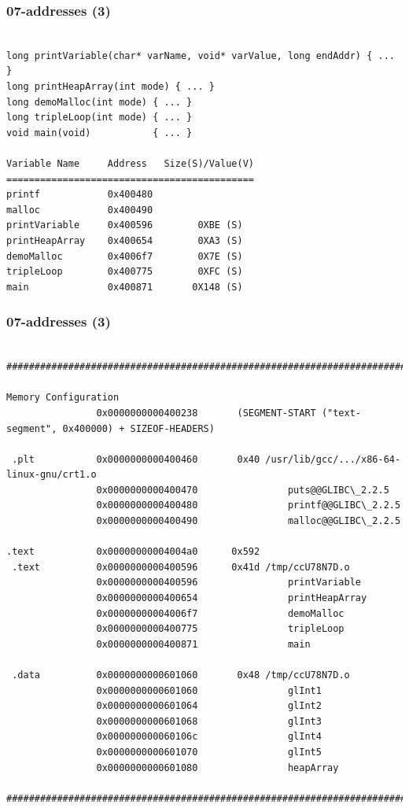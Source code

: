 \documentclass[xcolor=table, notheorems, hyperref={pdfpagelabels=false}]{beamer}
\begin{document}
\begin{frame}[fragile]
\frametitle{07-addresses (3)}
\begin{lstlisting}[basicstyle=\ttfamily\footnotesize]

long printVariable(char* varName, void* varValue, long endAddr) { ... }
long printHeapArray(int mode) { ... }
long demoMalloc(int mode) { ... }
long tripleLoop(int mode) { ... }
void main(void)           { ... }

Variable Name     Address   Size(S)/Value(V)
============================================
printf            0x400480
malloc            0x400490
printVariable     0x400596        0XBE (S)
printHeapArray    0x400654        0XA3 (S)
demoMalloc        0x4006f7        0X7E (S)
tripleLoop        0x400775        0XFC (S)
main              0x400871       0X148 (S)

\end{lstlisting}
\end{frame}

\begin{frame}[fragile]
\frametitle{07-addresses (3)}
\begin{lstlisting}[basicstyle=\ttfamily\tiny]

####################################################################################################

Memory Configuration
                0x0000000000400238       (SEGMENT-START ("text-segment", 0x400000) + SIZEOF-HEADERS)

 .plt           0x0000000000400460       0x40 /usr/lib/gcc/.../x86-64-linux-gnu/crt1.o
                0x0000000000400470                puts@@GLIBC\_2.2.5
                0x0000000000400480                printf@@GLIBC\_2.2.5
                0x0000000000400490                malloc@@GLIBC\_2.2.5

.text           0x00000000004004a0      0x592
 .text          0x0000000000400596      0x41d /tmp/ccU78N7D.o
                0x0000000000400596                printVariable
                0x0000000000400654                printHeapArray
                0x00000000004006f7                demoMalloc
                0x0000000000400775                tripleLoop
                0x0000000000400871                main

 .data          0x0000000000601060       0x48 /tmp/ccU78N7D.o
                0x0000000000601060                glInt1
                0x0000000000601064                glInt2
                0x0000000000601068                glInt3
                0x000000000060106c                glInt4
                0x0000000000601070                glInt5
                0x0000000000601080                heapArray

####################################################################################################

\end{lstlisting}
\end{frame}
\end{document}
